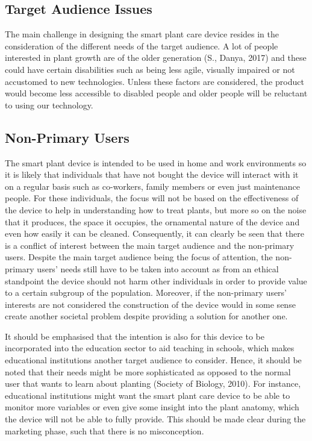 \documentclass{article}
\begin{document}
\subsection{Target Audience Issues}
The main challenge in designing the smart plant care device resides in the consideration of the different needs of the target audience. A lot of people interested in plant growth are of the older generation (S., Danya, 2017) and these could have certain disabilities such as being less agile, visually impaired or not accustomed to new technologies. Unless these factors are considered, the product would become less accessible to disabled people and older people will be reluctant to using our technology. 

\subsection{Non-Primary Users}
The smart plant device is intended to be used in home and work environments so it is likely that individuals that have not bought the device will interact with it on a regular basis such as co-workers, family members or even just maintenance people. For these individuals, the focus will not be based on the effectiveness of the device to help in understanding how to treat plants, but more so on the noise that it produces, the space it occupies, the ornamental nature of the device and even how easily it can be cleaned. Consequently, it can clearly be seen that there is a conflict of interest between the main target audience and the non-primary users. Despite the main target audience being the focus of attention, the non-primary users' needs still have to be taken into account as from an ethical standpoint the device should not harm other individuals in order to provide value to a certain subgroup of the population. Moreover, if the non-primary users' interests are not considered the construction of the device would in some sense create another societal problem despite providing a solution for another one.

It should be emphasised that the intention is also for this device to be incorporated into the education sector to aid teaching in schools, which makes educational institutions another target audience to consider. Hence, it should be noted that their needs might be more sophisticated as opposed to the normal user that wants to learn about planting (Society of Biology, 2010). For instance, educational institutions might want the smart plant care device to be able to monitor more variables or even give some insight into the plant anatomy, which the device will not be able to fully provide. This should be made clear during the marketing phase, such that there is no misconception.
\end{document}
